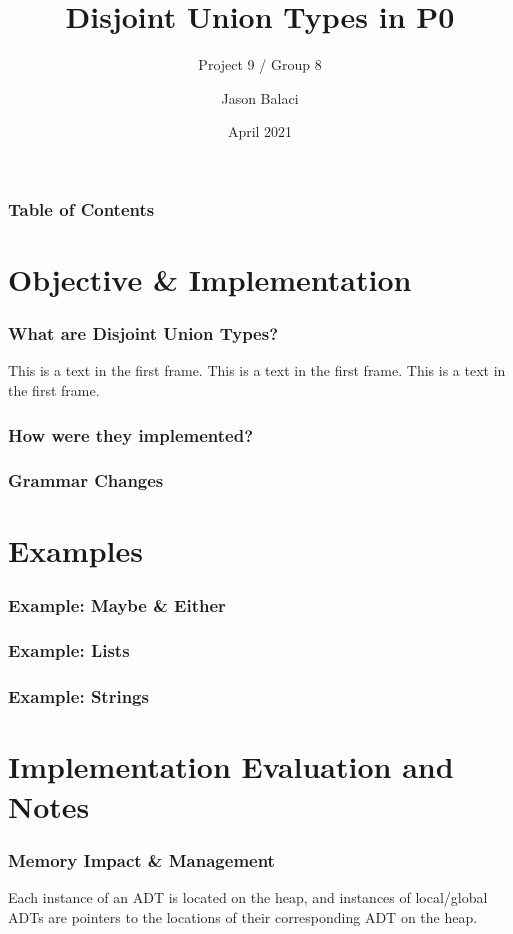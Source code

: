 \documentclass{beamer}
\title[Disjoint Union Types]{Disjoint Union Types in P0}
\subtitle{Project 9 / Group 8}
\author{Jason Balaci}
\institute{McMaster University}
\date{April 2021}
\begin{document}
\frame{\titlepage}

\begin{frame}
\frametitle{Table of Contents}
\tableofcontents
\end{frame}

\section{Objective \& Implementation}

\begin{frame}
\frametitle{What are Disjoint Union Types?}
This is a text in the first frame. This is a text in the first frame. This is a text in the first frame.\\
\end{frame}

\begin{frame}
\frametitle{How were they implemented?}
\end{frame}

\begin{frame}
\frametitle{Grammar Changes}
\end{frame}

\section{Examples}

\begin{frame}
\frametitle{Example: Maybe \& Either}
\end{frame}

\begin{frame}
\frametitle{Example: Lists}
\end{frame}

\begin{frame}
\frametitle{Example: Strings}
\end{frame}

\section{Implementation Evaluation and Notes}

\begin{frame}
\frametitle{Memory Impact \& Management}

Each instance of an ADT is located on the heap, and instances of local/global ADTs are pointers to the locations of their corresponding ADT on the heap.

\end{frame}
\end{document}
